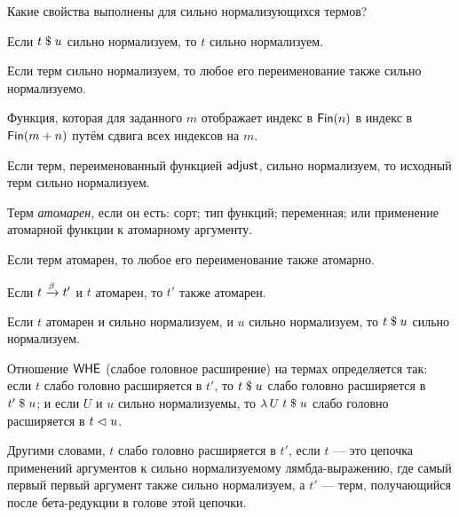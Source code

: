 Какие свойства выполнены для сильно нормализующихся
термов?

\begin{lemma}
Если $t\;\$\;u$ сильно нормализуем, то $t$
сильно нормализуем.
\end{lemma}

\begin{lemma}
Если терм сильно нормализуем, то любое его
переименование также сильно нормализуемо.
\end{lemma}

\begin{definition}[Аджаст]
Функция, которая для заданного $m$ отображает индекс
в $\mathsf{Fin}(n)$ в индекс в $\mathsf{Fin}(m+n)$ путём сдвига
всех индексов на $m$.
\end{definition}

\begin{lemma}
Если терм, переименованный функцией $\mathsf{adjust}$,
сильно нормализуем, то исходный терм
сильно нормализуем.
\end{lemma}

\begin{definition}
Терм \emph{атомарен}, если он есть: сорт; тип функций;
переменная; или применение атомарной функции к
атомарному аргументу.
\end{definition}

\begin{lemma}
Если терм атомарен, то любое его переименование
также атомарно.
\end{lemma}

\begin{lemma}
Если $t \xrightarrow{\beta} t'$ и $t$ атомарен, то $t'$
также атомарен.
\end{lemma}

\begin{lemma}
Если $t$ атомарен и сильно нормализуем,
и $u$ сильно нормализуем, то $t\;\$\;u$
сильно нормализуем.
\end{lemma}

\begin{definition}
Отношение $\mathsf{WHE}$ (слабое головное расширение)
на термах определяется так: если $t$ слабо головно
расширяется в $t'$, то $t\;\$\;u$ слабо головно
расширяется в $t'\;\$\;u$; и если $U$ и $u$
сильно нормализуемы, то
$\lambda\,U\;t\;\$\;u$ слабо головно расширяется
в $t \vartriangleleft u$.

Другими словами, $t$ слабо головно расширяется в $t'$,
если $t$ --- это цепочка применений аргументов к
сильно нормализуемому лямбда-выражению, где самый
первый первый аргумент также сильно нормализуем, а $t'$
--- терм, получающийся после бета-редукции в голове
этой цепочки.
\end{definition}

